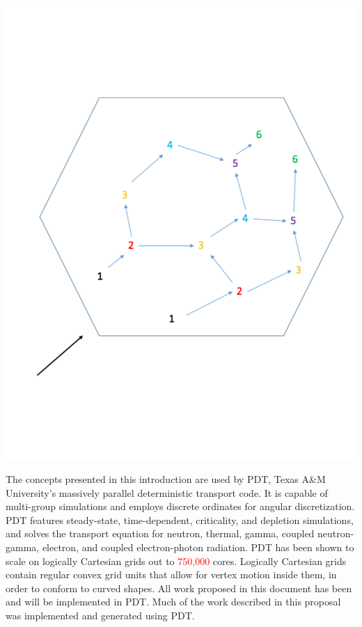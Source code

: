 \documentclass[11pt, letterpaper,titlepage,oneside]{article}
\newcommand{\tcr}[1]{\textcolor{red}{#1}}
\begin{document}
\noindent\begin{minipage}{\textwidth}
\centering
\includegraphics[scale = 0.5]{../figures/tdg.pdf}
\label{tdg}
\end{minipage}
\smallskip

The concepts presented in this introduction are used by PDT, Texas A\&M University's massively parallel deterministic transport code. It is capable of multi-group simulations and employs discrete ordinates for angular discretization. PDT features steady-state, time-dependent, criticality, and depletion simulations, and solves the transport equation for neutron, thermal, gamma, coupled neutron-gamma, electron, and coupled electron-photon radiation. PDT has been shown to scale on logically Cartesian grids out to \tcr{750,000} cores. Logically Cartesian grids contain regular convex grid units that allow for vertex motion inside them, in order to conform to curved shapes. All work proposed in this document has been and will be implemented in PDT. Much of the work described in this proposal was implemented and generated using PDT.
\end{document}
